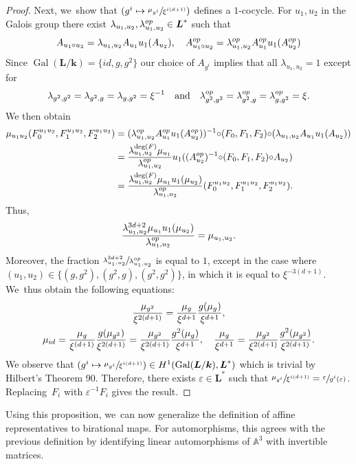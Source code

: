 \documentclass[10pt,a4paper]{amsart}
\newcommand\mto{\mathchoice{\longmapsto}{\mapsto}{\mapsto}{\mapsto}}
\newcommand{\id}{\textup{id}}
\newcommand{\op}{\textup{op}}
\newcommand{\quand}{\quad\text{and}\quad}
\DeclareMathOperator{\Gal}{Gal}
\let\epsilon\varepsilon
\theoremstyle{definition}
\newcommand{\kk}{{\boldsymbol{k}}}
\newcommand{\LL}{{\boldsymbol{L}}}
\begin{document}
\begin{proof}
Next, we~show that $(g^{i} \mto \sfrac{\mu_{g^i}}{\xi^{i(d+1)}})$ defines a $1$-cocycle.
For $u_1,u_2$ in the Galois group there exist $\lambda_{u_1,u_2}, \lambda_{u_1,u_2}^{\op} \in \LL^*$ such that
\[
A_{u_1 \circ u_2} = \lambda_{u_1,u_2} A_{u_1} u_1(A_{u_2}), \quad A_{u_1 \circ u_2}^{\op} = \lambda_{u_1,u_2}^{\op} A_{u_1}^{\op} u_1(A_{u_2}^{\op})
\]
Since $\Gal(\LL/\kk) = \{id,g,g^2 \}$ our choice of $A_{g^i}$ implies that all $\lambda_{u_1,u_2} = 1$ except for
\[
\lambda_{g^2,g^2} = \lambda_{g^2,g} = \lambda_{g,g^2} = \xi^{-1}
\quand
\lambda_{g^2,g^2}^{\op} = \lambda_{g^2,g}^{\op} =\lambda_{g,g^2}^{\op} = \xi.
\]
We then obtain
\begin{align*}
\mu_{u_1u_2}(F_0^{u_1u_2},F_1^{u_1u_2},F_2^{u_1u_2}) &= (\lambda_{u_1,u_2}^{\op} A_{u_1}^{\op} u_1(A_{u_2}^{\op}))^{-1} {\circ} (F_0,F_1,F_2) {\circ} (\lambda_{u_1,u_2} A_{u_1} u_1(A_{u_2}))
\\&
= \frac{\lambda_{u_1,u_2}^{\deg(F)} \mu_{u_1}}{\lambda_{u_1,u_2}^{\op}} u_1((A_{u_2}^{\op})^{-1} {\circ} (F_0, F_1, F_2) {\circ} A_{u_2})
\\&
= \frac{\lambda_{u_1,u_2}^{\deg(F)} \mu_{u_1} u_1(\mu_{u_2})}{\lambda_{u_1,u_2}^{\op}} (F_0^{u_1u_2},F_1^{u_1u_2},F_2^{u_1u_2}).
\end{align*}
Thus,
\[
\frac{\lambda_{u_1,u_2}^{3d + 2} \mu_{u_1} u_1(\mu_{u_2})}{\lambda_{u_1,u_2}^{\op}} = \mu_{u_1,u_2}.
\]
Moreover, the fraction $\sfrac{\lambda_{u_1,u_2}^{3d + 2}}{\lambda_{u_1,u_2}^{\op}}$ is equal to $1$, except in the case where $(u_1,u_2) \in \{ (g,g^2), (g^2,g),(g^2,g^2) \}$, in which it is equal to $\xi^{-3(d+1)}$. We~thus obtain the following equations:
\begin{gather*}
\frac{\mu_{g^2}}{\xi^{2(d+1)}} = \frac{\mu_g}{\xi^{d+1}} \frac{g(\mu_g)}{\xi^{d+1}},
\\
\mu_{\id} = \frac{\mu_g}{\xi^{(d+1)}} \frac{g(\mu_{g^2})}{\xi^{2(d+1)}} = \frac{\mu_{g^2}}{\xi^{2(d+1)}} \frac{g^2(\mu_g)}{\xi^{d+1}}, \quad \frac{\mu_g}{\xi^{d+1}} = \frac{\mu_{g^2}}{\xi^{2(d+1)}}\frac{g^2(\mu_{g^2})}{\xi^{2(d+1)}}.
\end{gather*}
We observe that $(g^{i} \mto \sfrac{\mu_{g^i}}{\xi^{i(d+1)}}) \in H^1(\Gal(\LL/\kk),\LL^*)$ which is trivial by Hilbert's Theorem 90. Therefore, there exists $\epsilon \in \LL^*$ such that $\sfrac{\mu_{g^{i}}}{ \xi^{i(d+1)}} = \sfrac{\epsilon}{g^{i}(\epsilon)}$. Replacing~$F_i$ with $\epsilon^{-1} F_i$ gives the result.
\end{proof}
Using this proposition, we~can now generalize the definition of affine representatives to birational maps. For automorphisms, this agrees with the previous definition by identifying linear automorphisms of $\mathbb{A}^3$ with invertible matrices.
\end{document}
